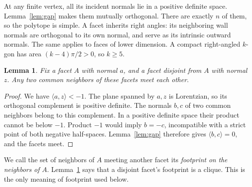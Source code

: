 \documentclass[11pt]{article}
\newtheorem{lemma}[theorem]{Lemma}
\theoremstyle{remark}
\newcommand{\ip}[2]{\langle #1,#2\rangle}
\begin{document}
At any finite vertex, all its incident normals lie in a positive definite
space. Lemma~\ref{lem:gap} makes them mutually orthogonal. There are
exactly $n$ of them, so the polytope is simple. A facet inherits right
angles: its neighboring wall normals are orthogonal to its own normal,
and serve as its intrinsic outward normals. The same applies to faces
of lower dimension. A compact right-angled $k$-gon has area
$(k-4)\pi/2>0$, so $k\ge5$.

\begin{lemma}\label{lem:footprint}
Fix a facet $A$ with normal $a$, and a facet disjoint from $A$ with
normal $z$. Any two common neighbors of these facets meet each other.
\end{lemma}
\begin{proof}
We have $\ip{a}{z}<-1$. The plane spanned by $a,z$ is Lorentzian, so
its orthogonal complement is positive definite. The normals $b,c$ of
two common neighbors belong to this complement. In a positive definite
space their product cannot be below $-1$. Product $-1$ would imply
$b=-c$, incompatible with a strict point of both negative half-spaces.
Lemma~\ref{lem:gap} therefore gives $\ip{b}{c}=0$, and the facets meet.
\end{proof}

We call the set of neighbors of $A$ meeting another facet its
\emph{footprint on the neighbors of $A$}. Lemma~\ref{lem:footprint}
says that a disjoint facet's footprint is a clique. This is the only
meaning of footprint used below.
\end{document}
